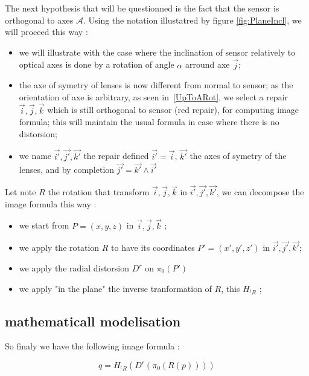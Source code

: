 The next  hypothesis  that will be questionned is the fact that the sensor is 
orthogonal to axes $\mathcal{A}$.  Using the notation illustatred by 
figure \ref{fig:PlaneIncl}, we will proceed this way :

\begin{itemize}
     \item  we will illustrate with the case where the inclination of sensor relatively
	     to optical axes is done by a rotation of angle $\alpha$ arround axe $\vec{j}$;

     \item  the axe of symetry of lenses is now different from normal to sensor;
	     as the orientation of axe is arbitrary, as seen in~\ref{UpToARot},
             we select a repair $\vec{i},\vec{j},\vec{k}$  which is still orthogonal to sensor (red repair),
	     for computing image formula; this will maintain the usual formula
             in case where there is no distorsion;

     \item we name  $\vec{i'},\vec{j'},\vec{k'}$ the repair defined $\vec{i'}=\vec{i}$,
	     $\vec{k'}$ the axes of symetry of the lenses, and  by completion $\vec{j'} = \vec{k'} \wedge  \vec{i'} $
\end{itemize}

Let note $R$ the rotation that transform $\vec{i},\vec{j},\vec{k}$ in $\vec{i'},\vec{j'},\vec{k'}$, we can decompose 
the image formula this way :

\begin{itemize}
	\item  we start from  $P=(x,y,z)$  in $\vec{i},\vec{j},\vec{k}$ ;
	\item  we apply the rotation $R$ to have its coordinates $P'=(x',y',z')$ in $\vec{i'},\vec{j'},\vec{k'}$;
         \item we apply the radial  distorsion $D^r$ on $\pi_0(P') $
	 \item we apply "in the plane" the inverse tranformation of $R$, this $H_{^tR}$ ;
\end{itemize}

\subsection{mathematicall modelisation}

So finaly we have the following image formula :

\begin{equation}
	q = H_{^tR} (D^r( \pi_0(R(p))))
\end{equation}

